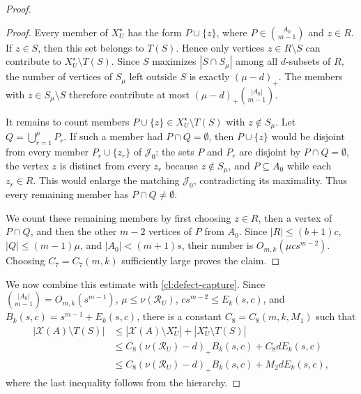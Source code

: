 \documentclass[10pt,a4paper]{amsart}
\newcommand{\Rcal}{\mathcal R}
\newcommand{\X}{\mathcal X}
\begin{document}
\begin{proof}
        \begin{proof}
                Every member of $X_U^\star$ has the form $P\cup\{z\}$,
                where $P\in\binom{A_0}{m-1}$ and $z\in R$.
                If $z\in S$, then this set belongs to $T(S)$.
                Hence only vertices $z\in R\setminus S$ can contribute to
                $X_U^\star\setminus T(S)$.
                Since $S$ maximizes $|S\cap S_\mu|$ among all
                $d$-subsets of $R$, the number of vertices of $S_\mu$
                left outside $S$ is exactly $(\mu-d)_+$.
                The members with $z\in S_\mu\setminus S$ therefore
                contribute at most $(\mu-d)_+\binom{|A_0|}{m-1}$.

                It remains to count members
                $P\cup\{z\}\in X_U^\star\setminus T(S)$ with
                $z\notin S_\mu$.
                Let $Q=\bigcup_{r=1}^{\mu}P_r$.
                If such a member had $P\cap Q=\emptyset$, then
                $P\cup\{z\}$ would be disjoint from every member
                $P_r\cup\{z_r\}$ of $\mathcal J_0$: the sets $P$ and
                $P_r$ are disjoint by $P\cap Q=\emptyset$, the vertex
                $z$ is distinct from every $z_r$ because $z\notin S_\mu$,
                and $P\subseteq A_0$ while each $z_r\in R$.
                This would enlarge the matching $\mathcal J_0$,
                contradicting its maximality.
                Thus every remaining member has $P\cap Q\ne\emptyset$.

                We count these remaining members by first choosing
                $z\in R$, then a vertex of $P\cap Q$, and then the other
                $m-2$ vertices of $P$ from $A_0$.
                Since $|R|\le(b+1)c$, $|Q|\le(m-1)\mu$, and
                $|A_0|<(m+1)s$, their number is
                $O_{m,k}(\mu cs^{m-2})$.  Choosing $C_7=C_7(m,k)$
                sufficiently large proves the claim.
        \end{proof}

        We now combine this estimate with \cref{cl:defect-capture}.
        Since $\binom{|A_0|}{m-1}=O_{m,k}(s^{m-1})$,
        $\mu\le\nu(\Rcal_U)$, $cs^{m-2}\le E_k(s,c)$, and
        $B_k(s,c)=s^{m-1}+E_k(s,c)$, there is a constant
        $C_8=C_8(m,k,M_1)$ such that
        \[
                \begin{aligned}
                        |\X(A)\setminus T(S)|
                         & \le
                        |\X(A)\setminus X_U^\star|
                        +|X_U^\star\setminus T(S)| \\
                         & \le
                        C_8(\nu(\Rcal_U)-d)_+B_k(s,c)
                        +C_8dE_k(s,c)              \\
                         & \le
                        C_8(\nu(\Rcal_U)-d)_+B_k(s,c)
                        +M_2dE_k(s,c),
                \end{aligned}
        \]
        where the last inequality follows from the hierarchy.


\end{proof}
\end{document}
